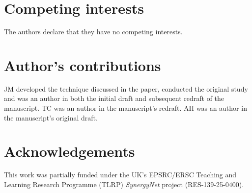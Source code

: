 \documentclass{bmcart}
\begin{document}
\begin{backmatter}

\section*{Competing interests}
The authors declare that they have no competing interests.

\section*{Author's contributions}
JM developed the technique discussed in the paper, conducted the original study and was an author in both the initial draft and subsequent redraft of the manuscript.
TC was an author in the manuscript's redraft.
AH was an author in the manuscript's original draft.

\section*{Acknowledgements}

This work was partially funded under the UK's EPSRC/ERSC Teaching and Learning Research Programme (TLRP) {\emph{SynergyNet}} project (RES-139-25-0400).




\end{backmatter}
\end{document}
